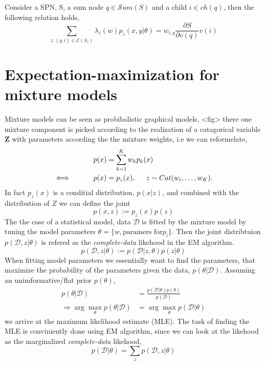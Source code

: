 \begin{proposition}
    Consider a SPN, S, a sum node $q \in \mathcal{S}um(S)$ and a child $i \in ch(q)$,
    then the following relation holds, 
    $$\sum_{z:(q,i)\in \mathcal{E}(S_z)} \lambda_z(w) p_z(x,y|\theta) = w_{i,q}
    \frac{\partial S}{\partial v(q)} v(i)$$
\end{proposition}

\newpage
\section{Expectation-maximization for mixture models}
Mixture models can be seen as probibalistic graphical models, <fig> there one mixture component is
picked according to the realization of a catagorical variable $\textbf{Z}$ with parameters according
the the mixture weights, i.e we can reformelate, 
\begin{align*}
    p(x) &= \sum_{k=1}^K w_k p_k(x)\\
   \iff \hspace*{1cm} p(x) &= p_z(x), \hspace*{0.5cm} z \sim Cat(w_i, \dots, w_K).
\end{align*}
In fact $p_z(x)$ is a conditial distribution, $p(x|z)$, and combined with the distribution
of $Z$ we can define the joint 
$$p(x,z):=p_z(x)p(z)$$
The the case of a statistical model, data $\mathcal{D}$ is fitted by the mixture model 
by tuning the model parameters $\theta = \{w, \text{paramers for} p_i\}$. Then the joint
distribtuion $p(\mathcal{D},z| \theta)$ is refered as the \textit{complete-data} likehood in the EM algorithm. 
$$p(\mathcal{D},z|\theta):=p(\mathcal{D}|z,\theta)p(z|\theta)$$ 
When fitting model parameters we essentially want to find the parameters, that maximize the probability of
the parameters given the data, $p(\theta|\mathcal{D})$. Assuming an
unimformative/flat prior $p(\theta)$, 
\begin{align*}
p(\theta|\mathcal{D})&= \frac{p(\mathcal{D}|\theta)p(\theta)}{p(\mathcal{D})}\\
\Rightarrow  \arg\max_{\theta} p(\theta|\mathcal{D}) &= \arg\max_{\theta} p(\mathcal{D}|\theta)
\end{align*}
we arrive at the maximum likelihood estimate (MLE). The task of finding the MLE is conviniently
done using EM algorithm, since we can look at the likehood as the marginalized
\textit{complete-data} likehood, 
$$p(\mathcal{D}|\theta) = \sum_z p(\mathcal{D}, z|\theta)$$


